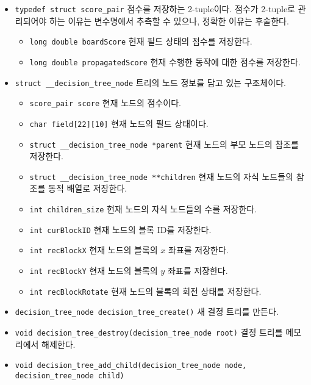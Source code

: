 \begin{itemize}
    \item \texttt{typedef struct score_pair}
    점수를 저장하는 2-tuple이다. 점수가 2-tuple로 관리되어야 하는 이유는 변수명에서 추측할 수 있으나, 정확한 이유는 후술한다.
    \begin{itemize}
        \item \texttt{long double boardScore} 현재 필드 상태의 점수를 저장한다.
        \item \texttt{long double propagatedScore} 현재 수행한 동작에 대한 점수를 저장한다.
    \end{itemize}
    \item \texttt{struct __decision_tree_node}
    트리의 노드 정보를 담고 있는 구조체이다.
    \begin{itemize}
        \item \texttt{score_pair score} 현재 노드의 점수이다.
        \item \texttt{char field[22][10]} 현재 노드의 필드 상태이다.
        \item \texttt{struct __decision_tree_node *parent} 현재 노드의 부모 노드의 참조를 저장한다.
        \item \texttt{struct __decision_tree_node **children} 현재 노드의 자식 노드들의 참조를 동적 배열로 저장한다.
        \item \texttt{int children_size} 현재 노드의 자식 노드들의 수를 저장한다.
        \item \texttt{int curBlockID} 현재 노드의 블록 ID를 저장한다.
        \item \texttt{int recBlockX} 현재 노드의 블록의 $x$ 좌표를 저장한다.
        \item \texttt{int recBlockY} 현재 노드의 블록의 $y$ 좌표를 저장한다.
        \item \texttt{int recBlockRotate} 현재 노드의 블록의 회전 상태를 저장한다.
    \end{itemize}
    \item \texttt{decision_tree_node decision_tree_create()}
    새 결정 트리를 만든다.
    \item \texttt{void decision_tree_destroy(decision_tree_node root)}
    결정 트리를 메모리에서 해제한다.
    \item \texttt{void decision_tree_add_child(decision_tree_node node, decision_tree_node child)}

\end{itemize}
